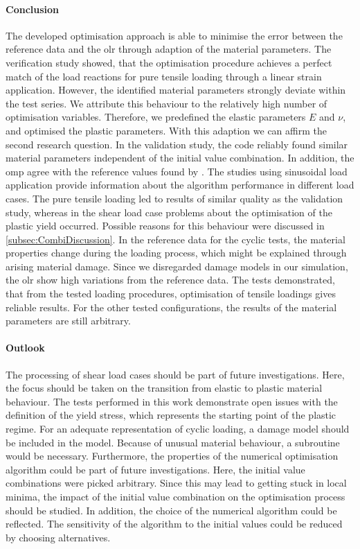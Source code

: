\paragraph{Conclusion}
The developed optimisation approach is able to minimise the error between the reference data and the \acrlong{olr} through adaption of the material parameters. The verification study showed, that the optimisation procedure achieves a perfect match of the load reactions for pure tensile loading through a linear strain application. However, the identified material parameters strongly deviate within the test series. We attribute this behaviour to the relatively high number of optimisation variables. Therefore, we predefined the elastic parameters $E$ and $\nu$, and optimised the plastic parameters. With this adaption we can affirm the second research question. In the validation study, the code reliably found similar material parameters independent of the initial value combination. In addition, the \acrlong{omp} agree with the reference values found by \citet{ries_deciphering_nodate}.
The studies using sinusoidal load application provide information about the algorithm performance in different load cases. The pure tensile loading led to results of similar quality as the validation study, whereas in the shear load case problems about the optimisation of the plastic yield occurred.
Possible reasons for this behaviour were discussed in \autoref{subsec:CombiDiscussion}. In the reference data for the cyclic tests, the material properties change during the loading process, which might be explained through arising material damage. Since we disregarded damage models in our  simulation, the \acrlong{olr} show high variations from the reference data. The tests demonstrated, that from the tested loading procedures, optimisation of tensile loadings gives reliable results. For the other tested configurations, the results of the material parameters are still arbitrary.


\paragraph{Outlook}
The processing of shear load cases should be part of future investigations. Here, the focus should be taken on the transition from elastic to plastic material behaviour.
The tests performed in this work demonstrate open issues with the definition of the yield stress, which represents the starting point of the plastic regime. 
For an adequate representation of cyclic loading, a damage model should be included in the  model.
Because of unusual material behaviour, a subroutine would be necessary. 
Furthermore, the properties of the numerical optimisation algorithm could be part of future investigations.
Here, the initial value combinations were picked arbitrary.
Since this may lead to getting stuck in local minima, the impact of the initial value combination on the optimisation process should be studied. In addition, the choice of the numerical algorithm could be reflected.
The sensitivity of the algorithm to the initial values could be reduced by choosing alternatives. 

